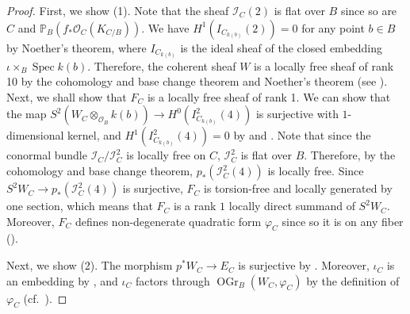 \documentclass[autodetect-engine, a4paper]{amsart}
\theoremstyle{definition}
\def\P{{\mathbb P}}
\def\cO{\mathcal{O}}
\DeclareMathOperator\Spec{\mathrm{Spec}}
\DeclareMathOperator\OGr{\mathrm{OGr}}
\newcommand{\cred}{\color{black}}
\newcommand{\cora}{\color{black}}
\begin{document}
\begin{proof}
First, we show (1).
{\cred Note that the sheaf $\mathcal{I}_{C} (2)$ is flat over $B$ since so are $C$ and $\P_{B} (f_* \cO_{C}(K_{C/B}))$.
We have 
$H^1 (I_{C_{k(b)}}(2)) =0$
for any point $b \in B$ by Noether's theorem, where $I_{C_{k(b)}}$ is the ideal sheaf of the closed embedding $\iota \times_{B} \Spec k(b)$.
Therefore, the coherent sheaf $W$ is a locally free sheaf of rank 10 by the cohomology and base change theorem and Noether's theorem (see \cite[(3.1)]{Mukaicurve}).}
{\cora Next, we shall show that $F_{C}$ is a locally free sheaf of rank 1. We can show that the map $S^2(W_{C}\otimes_{\cO_B} k(b)) \rightarrow H^0(I_{C_{k(b)}}^2(4))$
is surjective with $1$-dimensional kernel, and $H^1 (I_{C_{k(b)}}^2(4)) =0$ by 
\cite[Main theorem, Section 4, and Corollary 5.3]{Mukaicurve} and \cite[Corollary 4.4]{Kuznetsovspinor}.
Note that since the conormal bundle $\mathcal{I}_{C}/\mathcal{I}_{C}^2$ is locally free on $C$, $\mathcal{I}_{C}^2$ is flat over $B$.
Therefore, by the cohomology and base change theorem, $p_*(\mathcal{I}^2_{C}(4))$ is locally free.
Since $S^2 W_{C} \rightarrow p_*(\mathcal{I}^2_{C} (4))$ is surjective, 
$F_{C}$ is torsion-free and locally generated by one section, which means that $F_{C}$ is a rank $1$ locally direct summand of $S^2 W_{C}$.
Moreover, $F_{C}$ defines non-degenerate quadratic form $\varphi_{C}$ since so it is on any fiber (\cite[Theorem 4.2]{Mukaicurve}).
}

Next, we show (2).
The morphism $p^{\ast} W_{C} \rightarrow E_{C}$ is surjective by \cite[Section 3]{Mukaicurve}.
Moreover, $\iota_{C}$ is an embedding by \cite[Proposition 3.3]{Mukaicurve}, and $\iota_{C}$ factors through $\OGr_B (W_{C}, \varphi_{C})$ by the definition of $\varphi_{C}$ (cf.\ \cite[Proof of Theorem 0.4]{Mukaicurve}).


\end{proof}
\end{document}
